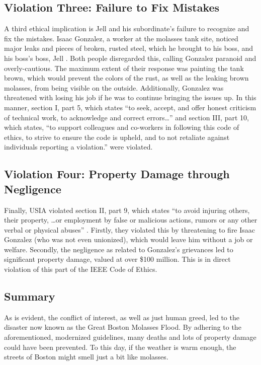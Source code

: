 \documentclass[conference]{IEEEtran}
\begin{document}
\subsection{Violation Three: Failure to Fix Mistakes}

A third ethical implication is Jell and his subordinate's failure to recognize and fix the mistakes. Isaac Gonzalez, a worker at the molasses tank site, noticed major leaks and pieces of broken, rusted steel, which he brought to his boss, and his boss's boss, Jell \cite{b1}. Both people disregarded this, calling Gonzalez paranoid and overly-cautious. The maximum extent of their response was painting the tank brown, which would prevent the colors of the rust, as well as the leaking brown molasses, from being visible on the outside. Additionally, Gonzalez was threatened with losing his job if he was to continue bringing the issues up. In this manner, section I, part 5, which states ``to seek, accept, and offer honest criticism of technical work, to acknowledge and correct errors\dots'' and section III, part 10, which states, ``to support colleagues and co-workers in following this code of ethics, to strive to ensure the code is upheld, and to not retaliate against individuals reporting a violation.'' \cite{b3} were violated.

\subsection{Violation Four: Property Damage through Negligence}

Finally, USIA violated section II, part 9, which states ``to avoid injuring others, their property, \dots or employment by false or malicious actions, rumors or any other verbal or physical abuses'' \cite{b3}. Firstly, they violated this by threatening to fire Isaac Gonzalez (who was not even unionized), which would leave him without a job or welfare. Secondly, the negligence as related to Gonzalez's grievances led to significant property damage, valued at over \$100 million. This is in direct violation of this part of the IEEE Code of Ethics.

\subsection{Summary}

As is evident, the conflict of interest, as well as just human greed, led to the disaster now known as the Great Boston Molasses Flood. By adhering to the aforementioned, modernized guidelines, many deaths and lots of property damage could have been prevented. To this day, if the weather is warm enough, the streets of Boston might smell just a bit like molasses.
\end{document}
